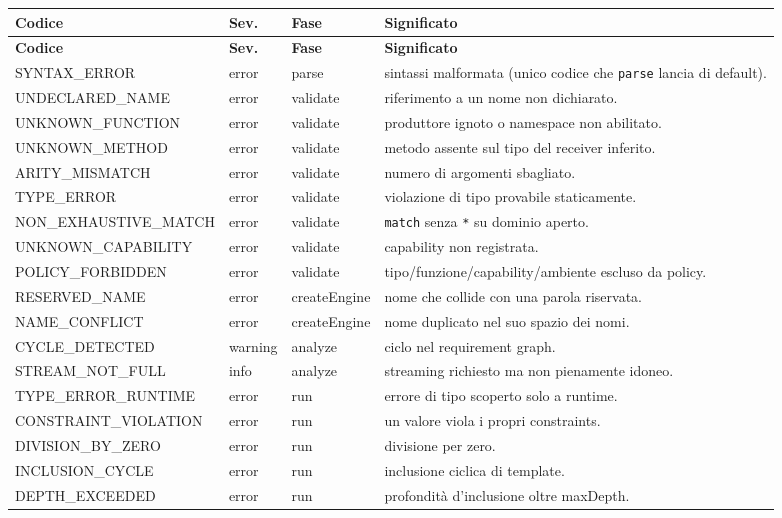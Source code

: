 \documentclass[11pt,a4paper]{book}
\let\code\lstinline
\newcommand{\ic}[1]{{\ttfamily #1}}
\theoremstyle{definition}
\begin{document}
{{{{\begin{center}
\small
\begin{longtable}{@{}l l l p{6.4cm}@{}}
\toprule
\textbf{Codice} & \textbf{Sev.} & \textbf{Fase} & \textbf{Significato} \\
\midrule
\endfirsthead
\toprule
\textbf{Codice} & \textbf{Sev.} & \textbf{Fase} & \textbf{Significato} \\
\midrule
\endhead
\bottomrule
\endfoot
\ic{SYNTAX\_ERROR} & error & parse & sintassi malformata (unico codice che
\code|parse| lancia di default). \\
\ic{UNDECLARED\_NAME} & error & validate & riferimento a un nome non dichiarato. \\
\ic{UNKNOWN\_FUNCTION} & error & validate & produttore ignoto o namespace non abilitato. \\
\ic{UNKNOWN\_METHOD} & error & validate & metodo assente sul tipo del receiver inferito. \\
\ic{ARITY\_MISMATCH} & error & validate & numero di argomenti sbagliato. \\
\ic{TYPE\_ERROR} & error & validate & violazione di tipo provabile staticamente. \\
\ic{NON\_EXHAUSTIVE\_MATCH} & error & validate & \code|match| senza \code|*| su dominio aperto. \\
\ic{UNKNOWN\_CAPABILITY} & error & validate & capability non registrata. \\
\ic{POLICY\_FORBIDDEN} & error & validate & tipo/funzione/capability/ambiente escluso da policy. \\
\ic{RESERVED\_NAME} & error & createEngine & nome che collide con una parola riservata. \\
\ic{NAME\_CONFLICT} & error & createEngine & nome duplicato nel suo spazio dei nomi. \\
\ic{CYCLE\_DETECTED} & warning & analyze & ciclo nel requirement graph. \\
\ic{STREAM\_NOT\_FULL} & info & analyze & streaming richiesto ma non pienamente idoneo. \\
\ic{TYPE\_ERROR\_RUNTIME} & error & run & errore di tipo scoperto solo a runtime. \\
\ic{CONSTRAINT\_VIOLATION} & error & run & un valore viola i propri \ic{constraints}. \\
\ic{DIVISION\_BY\_ZERO} & error & run & divisione per zero. \\
\ic{INCLUSION\_CYCLE} & error & run & inclusione ciclica di template. \\
\ic{DEPTH\_EXCEEDED} & error & run & profondità d'inclusione oltre \ic{maxDepth}. \\

\end{longtable}
\end{center}}}}}
\end{document}
